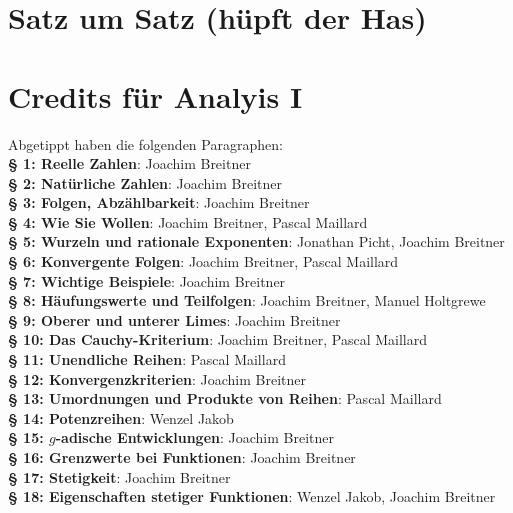 \documentclass[a4paper,oneside,DIV15,BCOR12mm]{scrbook}
\begin{document}
\appendix
\chapter{Satz um Satz (hüpft der Has)}

\renewcommand{\indexname}{Stichwortverzeichnis}
\printindex

\chapter{Credits für Analyis I} Abgetippt haben die folgenden Paragraphen:\\%
\textbf{§ 1: Reelle Zahlen}: Joachim Breitner\\
\textbf{§ 2: Natürliche Zahlen}: Joachim Breitner\\
\textbf{§ 3: Folgen, Abzählbarkeit}: Joachim Breitner\\
\textbf{§ 4: Wie Sie Wollen}: Joachim Breitner, Pascal Maillard\\
\textbf{§ 5: Wurzeln und rationale Exponenten}: Jonathan Picht, Joachim Breitner\\
\textbf{§ 6: Konvergente Folgen}: Joachim Breitner, Pascal Maillard\\
\textbf{§ 7: Wichtige Beispiele}: Joachim Breitner\\
\textbf{§ 8: Häufungswerte und Teilfolgen}: Joachim Breitner, Manuel Holtgrewe\\
\textbf{§ 9: Oberer und unterer Limes}: Joachim Breitner\\
\textbf{§ 10: Das Cauchy-Kriterium}: Joachim Breitner, Pascal Maillard\\
\textbf{§ 11: Unendliche Reihen}: Pascal Maillard\\
\textbf{§ 12: Konvergenzkriterien}: Joachim Breitner\\
\textbf{§ 13: Umordnungen und Produkte von Reihen}: Pascal Maillard\\
\textbf{§ 14: Potenzreihen}: Wenzel Jakob\\
\textbf{§ 15: $g$-adische Entwicklungen}: Joachim Breitner\\
\textbf{§ 16: Grenzwerte bei Funktionen}: Joachim Breitner\\
\textbf{§ 17: Stetigkeit}: Joachim Breitner\\
\textbf{§ 18: Eigenschaften stetiger Funktionen}: Wenzel Jakob, Joachim Breitner\\
\end{document}
